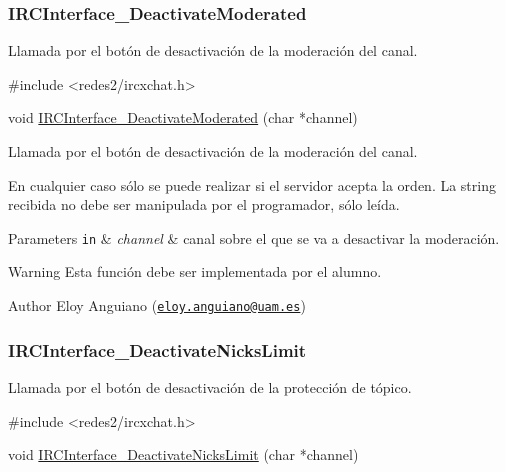  \hypertarget{IRCInterface_DeactivateModerated}{}\subsubsection{I\-R\-C\-Interface\-\_\-\-Deactivate\-Moderated}\label{IRCInterface_DeactivateModerated}
Llamada por el botón de desactivación de la moderación del canal.


\begin{DoxyCode}
\textcolor{preprocessor}{#include <redes2/ircxchat.h>}

\textcolor{keywordtype}{void} \hyperlink{xchat2_8c_ab760e8144b38f6c14bd809d157cee5d4}{IRCInterface\_DeactivateModerated} (\textcolor{keywordtype}{char} *channel)
\end{DoxyCode}


Llamada por el botón de desactivación de la moderación del canal.

En cualquier caso sólo se puede realizar si el servidor acepta la orden. La string recibida no debe ser manipulada por el programador, sólo leída.


\begin{DoxyParams}[1]{Parameters}
\mbox{\tt in}  & {\em channel} & canal sobre el que se va a desactivar la moderación.\\
\hline
\end{DoxyParams}
\begin{DoxyWarning}{Warning}
Esta función debe ser implementada por el alumno.
\end{DoxyWarning}
\begin{DoxyAuthor}{Author}
Eloy Anguiano (\href{mailto:eloy.anguiano@uam.es}{\tt eloy.\-anguiano@uam.\-es})
\end{DoxyAuthor}


 \hypertarget{IRCInterface_DeactivateNicksLimit}{}\subsubsection{I\-R\-C\-Interface\-\_\-\-Deactivate\-Nicks\-Limit}\label{IRCInterface_DeactivateNicksLimit}
Llamada por el botón de desactivación de la protección de tópico.


\begin{DoxyCode}
\textcolor{preprocessor}{#include <redes2/ircxchat.h>}

\textcolor{keywordtype}{void} \hyperlink{xchat2_8c_a92c8cfbe2e14e19277e1c97d11719e80}{IRCInterface\_DeactivateNicksLimit} (\textcolor{keywordtype}{char} *channel)
\end{DoxyCode}


